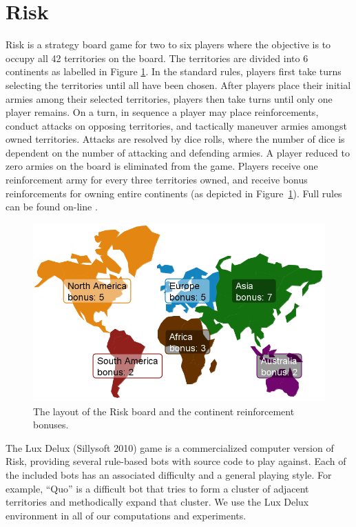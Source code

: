 \documentclass[letterpaper]{article}
\numberwithin{equation}{section}
\numberwithin{theorem}{section}
\numberwithin{lemma}{section}
\numberwithin{df}{section}
\begin{document}
\section{Risk}
\label{sec:Prob}

Risk is a strategy board game for two to six players where the objective is to occupy all 42 territories on the board.  The territories are divided into 6 continents as labelled in Figure \ref{fig:Conts}.  In the standard rules, players first take turns selecting the territories until all have been chosen.  After players place their initial armies among their selected territories, players then take turns until only one player remains.  On a turn, in sequence a player may place reinforcements, conduct attacks on opposing territories, and tactically maneuver armies amongst owned territories.  Attacks are resolved by dice rolls, where the number of dice is dependent on the number of attacking and defending armies.  A player reduced to zero armies on the board is eliminated from the game.  Players receive one reinforcement army for every three territories owned, and receive bonus reinforcements for owning entire continents (as depicted in Figure~\ref{fig:Conts}). %
Full rules can be found on-line \cite{Risk}.

\begin{figure}[t]
	\centering
	\includegraphics[scale=0.325]{../ForPublication/figs/Conts.png}
	\caption{The layout of the Risk board and the continent reinforcement bonuses.}
	\label{fig:Conts}
\end{figure}

The Lux Delux (Sillysoft 2010) \nocite{Lux} %
game is a commercialized computer version of Risk, providing several rule-based bots with source code to play against.  Each of the included bots has an associated difficulty and a general playing style.  For example, ``Quo'' is a difficult bot that tries to form a cluster of adjacent territories and methodically expand that cluster.  We use the Lux Delux environment in all of our computations and experiments.  
\end{document}
